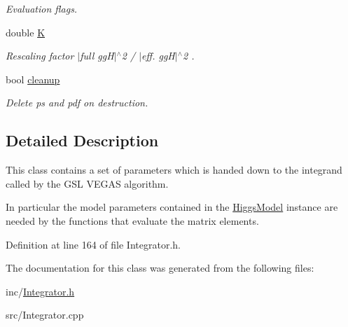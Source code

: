 \begin{DoxyCompactItemize}
\begin{DoxyCompactList}\small\item\em Evaluation flags. \end{DoxyCompactList}\item 
\hypertarget{classintegrand__par_afae7075055e10bd188d53fe2e1edd1e3}{}double \hyperlink{classintegrand__par_afae7075055e10bd188d53fe2e1edd1e3}{K}\label{classintegrand__par_afae7075055e10bd188d53fe2e1edd1e3}

\begin{DoxyCompactList}\small\item\em Rescaling factor $\vert$full gg\+H$\vert$$^\wedge$2 / $\vert$eff. gg\+H$\vert$$^\wedge$2 . \end{DoxyCompactList}\item 
\hypertarget{classintegrand__par_a1655b43b8c9e09a8bfbab014375aca49}{}bool \hyperlink{classintegrand__par_a1655b43b8c9e09a8bfbab014375aca49}{cleanup}\label{classintegrand__par_a1655b43b8c9e09a8bfbab014375aca49}

\begin{DoxyCompactList}\small\item\em Delete ps and pdf on destruction. \end{DoxyCompactList}\end{DoxyCompactItemize}


\subsection{Detailed Description}
This class contains a set of parameters which is handed down to the integrand called by the G\+S\+L V\+E\+G\+A\+S algorithm. 

In particular the model parameters contained in the \hyperlink{classHiggsModel}{Higgs\+Model} instance are needed by the functions that evaluate the matrix elements. 

Definition at line 164 of file Integrator.\+h.



The documentation for this class was generated from the following files\+:\begin{DoxyCompactItemize}
\item 
inc/\hyperlink{Integrator_8h}{Integrator.\+h}\item 
src/Integrator.\+cpp\end{DoxyCompactItemize}
